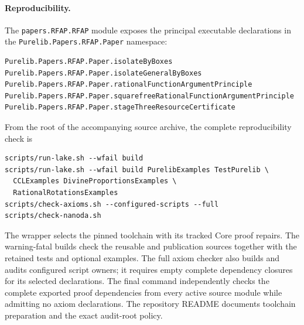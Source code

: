 \documentclass[11pt]{article}
\begin{document}
\paragraph{Reproducibility.}
The \texttt{papers.RFAP.RFAP} module exposes the principal executable
declarations in the \texttt{Purelib.Papers.RFAP.\allowbreak Paper} namespace:
\begin{verbatim}
Purelib.Papers.RFAP.Paper.isolateByBoxes
Purelib.Papers.RFAP.Paper.isolateGeneralByBoxes
Purelib.Papers.RFAP.Paper.rationalFunctionArgumentPrinciple
Purelib.Papers.RFAP.Paper.squarefreeRationalFunctionArgumentPrinciple
Purelib.Papers.RFAP.Paper.stageThreeResourceCertificate
\end{verbatim}
From the root of the accompanying source archive, the complete reproducibility
check is
\begin{verbatim}
scripts/run-lake.sh --wfail build
scripts/run-lake.sh --wfail build PurelibExamples TestPurelib \
  CCLExamples DivineProportionsExamples \
  RationalRotationsExamples
scripts/check-axioms.sh --configured-scripts --full
scripts/check-nanoda.sh
\end{verbatim}
The wrapper selects the pinned toolchain with its tracked Core proof repairs.
The warning-fatal builds check the reusable and publication sources together
with the retained tests and optional examples.  The full axiom checker also
builds and audits configured script owners; it requires empty complete
dependency closures for its selected declarations.  The final command
independently checks the complete exported proof dependencies from every
active source module while admitting no axiom declarations.  The repository
README documents toolchain preparation and the exact audit-root policy.
\end{document}
